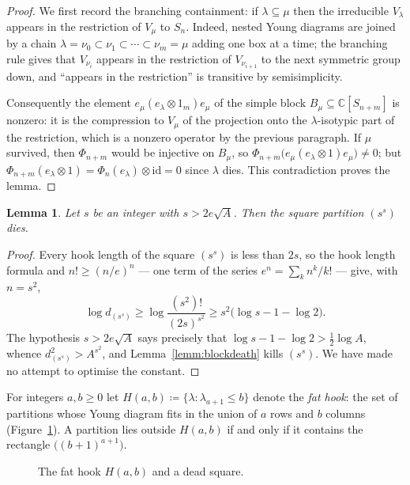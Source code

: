 \documentclass[11pt]{article}
\newtheorem{lemm}[theo]{Lemma}
\newcommand{\hook}[2]{H(#1,#2)}                   %
\begin{document}
\begin{proof}
We first record the branching containment: if
$\lambda\subseteq\mu$ then the irreducible $V_{\lambda}$ appears in
the restriction of $V_{\mu}$ to $S_{n}$. Indeed, nested Young
diagrams are joined by a chain
$\lambda=\nu_{0}\subset\nu_{1}\subset\dotsb\subset\nu_{m}=\mu$
adding one box at a time; the branching rule
\cite[Thm~2.8.3]{Sag01} gives that $V_{\nu_{i}}$ appears in the
restriction of $V_{\nu_{i+1}}$ to the next symmetric group down,
and ``appears in the restriction'' is transitive by
semisimplicity.

Consequently the element
$e_{\mu}(e_{\lambda}\otimes 1_{m})e_{\mu}$ of the simple block
$B_{\mu}\subseteq\mathbb{C}[S_{n+m}]$ is nonzero: it is the
compression to $V_{\mu}$ of the projection onto the
$\lambda$-isotypic part of the restriction, which is a nonzero
operator by the previous paragraph. If $\mu$ survived, then
$\Phi_{n+m}$ would be injective on $B_{\mu}$, so
$\Phi_{n+m}\bigl(e_{\mu}(e_{\lambda}\otimes1)e_{\mu}\bigr)\ne0$;
but
$\Phi_{n+m}(e_{\lambda}\otimes1)
=\Phi_{n}(e_{\lambda})\otimes\mathrm{id}=0$
since $\lambda$ dies. This contradiction proves the lemma.
\end{proof}

\begin{lemm}\label{lemm:squaredeath}
Let $s$ be an integer with $s>2e\sqrt{A}$. Then the square
partition $(s^{s})$ dies.
\end{lemm}

\begin{proof}
Every hook length of the square $(s^{s})$ is less than $2s$, so
the hook length formula and $n!\ge(n/e)^{n}$ --- one term of the
series $e^{n}=\sum_{k}n^{k}/k!$ --- give, with $n=s^{2}$,
\[
\log d_{(s^{s})}
\ge \log\frac{(s^{2})!}{(2s)^{s^{2}}}
\ge s^{2}\bigl(\log s-1-\log 2\bigr).
\]
The hypothesis $s>2e\sqrt{A}$ says precisely that
$\log s-1-\log2>\tfrac12\log A$, whence
$d_{(s^{s})}^{2}>A^{s^{2}}$, and Lemma~\ref{lemm:blockdeath} kills
$(s^{s})$. We have made no attempt to optimise the constant.
\end{proof}

For integers $a,b\ge0$ let
$\hook{a}{b}\coloneqq\{\lambda:\lambda_{a+1}\le b\}$ denote the
\emph{fat hook}: the set of partitions whose Young diagram fits in
the union of $a$ rows and $b$ columns
(Figure~\ref{fig:fathook}). A partition lies outside
$\hook{a}{b}$ if and only if it contains the rectangle
$\bigl((b+1)^{a+1}\bigr)$.

\begin{figure}
\centering

\caption{The fat hook $\hook{a}{b}$ and a dead square.}
\label{fig:fathook}
\end{figure}
\FloatBarrier
\end{document}
